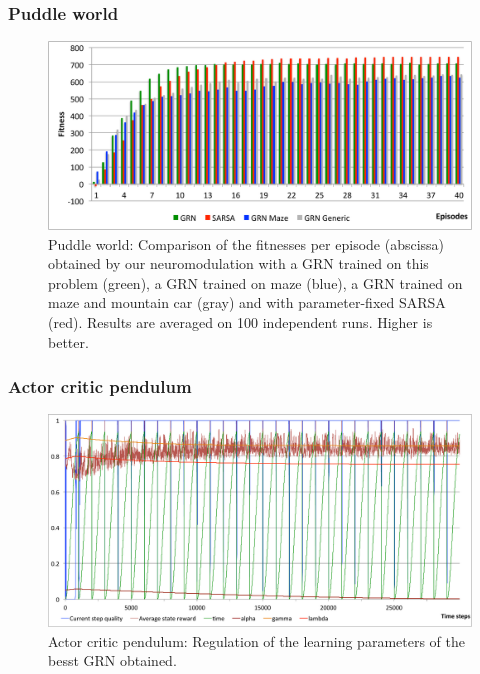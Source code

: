 \subsubsection{Puddle world}
\begin{figure}[h]
\includegraphics[width=\linewidth]{PW_GRNvsSARSA.pdf}
\caption{Puddle world: Comparison of the fitnesses per episode (abscissa) obtained by our neuromodulation with a GRN trained on this problem (green), a GRN trained on maze (blue), a GRN trained on maze and mountain car (gray) and with parameter-fixed SARSA (red). Results are averaged on 100 independent runs. Higher is better.}\label{fig:PW:GRNvsSARSA}
\end{figure}



\subsubsection{Actor critic pendulum}
\begin{figure}[h]
\center
\includegraphics[width=\linewidth]{ACP_GRNBehavior.pdf}
\caption{Actor critic pendulum: Regulation of the learning parameters of the besst GRN obtained.}\label{fig:ACP:GRNBehavior}
\end{figure}

